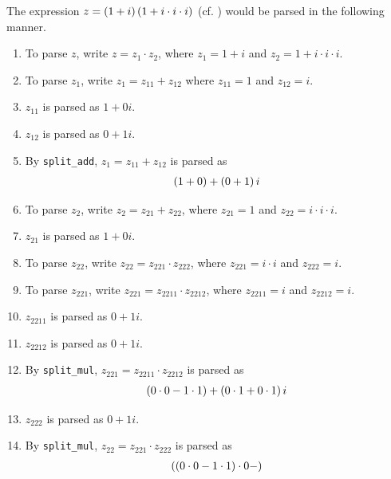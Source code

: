 \begin{boxexample}\label{Ch5:Eg:Parse}
    The expression $z = \left( 1 + i \right)\left( 1 + i \cdot i \cdot i \right)$ (cf. ) would be parsed in the following manner.
    \begin{enumerate}[noitemsep]
        \item To parse $z$, write $z = z_1 \cdot z_2$, where $z_1 = 1 + i$ and $z_2 = 1 + i \cdot i \cdot i$.
        \item To parse $z_1$, write $z_1 = z_{11} + z_{12}$ where $z_{11} = 1$ and $z_{12} = i$.
        \item $z_{11}$ is parsed as $1 + 0i$.
        \item $z_{12}$ is parsed as $0 + 1i$.
        \item By \lstinline|split_add|, $z_1 = z_{11} + z_{12}$ is parsed as
              \begin{align*}
                  \left( 1 + 0 \right) + \left( 0 + 1 \right)i
              \end{align*}
        \item To parse $z_2$, write $z_2 = z_{21} + z_{22}$, where $z_{21} = 1$ and $z_{22} = i \cdot i \cdot i$.
        \item $z_{21}$ is parsed as $1 + 0i$.
        \item To parse $z_{22}$, write $z_{22} = z_{221} \cdot z_{222}$, where $z_{221} = i \cdot i$ and $z_{222} = i$.
        \item To parse $z_{221}$, write $z_{221} = z_{2211} \cdot z_{2212}$, where $z_{2211} = i$ and $z_{2212} = i$.
        \item $z_{2211}$ is parsed as $0 + 1i$.
        \item $z_{2212}$ is parsed as $0 + 1i$.
        \item By \lstinline|split_mul|, $z_{221} = z_{2211} \cdot z_{2212}$ is parsed as
              \begin{align*}
                  \left( 0 \cdot 0 - 1 \cdot 1 \right) + \left( 0 \cdot 1 + 0 \cdot 1 \right)i
              \end{align*}
        \item $z_{222}$ is parsed as $0 + 1i$.
        \item By \lstinline|split_mul|, $z_{22} = z_{221} \cdot z_{222}$ is parsed as
              \begin{align*}
                  \left( 
                    \left( 0 \cdot 0 - 1 \cdot 1 \right)
                        \cdot
                    0
                    -
 \right)
\end{align*}
\end{enumerate}
\end{boxexample}
